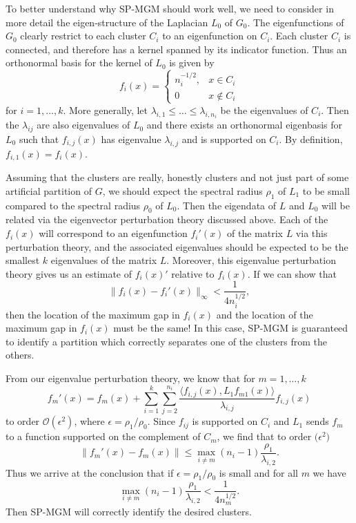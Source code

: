 \documentclass[10pt,journal,compsoc]{IEEEtran} %
\theoremstyle{definition}
\newcommand{\sheaf}[1]{\mathcal{#1}}
\begin{document}
To better understand why SP-MGM should work well, we need to consider
in more detail the eigen-structure of the Laplacian $L_0$ of
$G_0$.  The eigenfunctions of $G_0$ clearly restrict to each cluster
$C_i$ to an eigenfunction on $C_i$.  Each cluster $C_i$ is connected,
and therefore has a kernel spanned by its indicator function.  Thus an
orthonormal basis for the kernel of $L_0$ is given by
$$f_i(x) = \left\lbrace\begin{array}{cc}n_i^{-1/2}, & x\in C_i\\ 0 & x\notin C_i\end{array}\right.$$
for $i=1,\dots,k$.  More generally, let $\lambda_{i,1}\leq\dots\leq
\lambda_{i,n_i}$ be the eigenvalues of $C_i$.  Then the $\lambda_{ij}$
are also eigenvalues of $L_0$ and there exists an orthonormal
eigenbasis for $L_0$ such that $f_{i,j}(x)$ has eigenvalue
$\lambda_{i,j}$ and is supported on $C_i$.  By definition, $f_{i,1}(x)
= f_i(x)$.

Assuming that the clusters are really, honestly clusters and not just
part of some artificial partition of $G$, we should expect the
spectral radius $\rho_1$ of $L_1$ to be small compared
to the spectral radius $\rho_0$ of $L_0$.  Then the eigendata of $L$
and $L_0$ will be related via the eigenvector perturbation theory
discussed above.  Each of the $f_i(x)$ will correspond to an
eigenfunction $f_i'(x)$ of the matrix $L$ via this perturbation
theory, and the associated eigenvalues should be expected to be the
smallest $k$ eigenvalues of the matrix $L$.  Moreover, this eigenvalue
perturbation theory gives us an estimate of $f_i(x)'$ relative to
$f_i(x)$.  If we can show that
$$\|f_i(x)-f_i'(x)\|_\infty < \frac{1}{4n_i^{1/2}},$$
then the location of the maximum gap in $f_i(x)$ and the location of
the maximum gap in $f_i(x)$ must be the same!  In this case, SP-MGM is
guaranteed to identify a partition which correctly separates one of
the clusters from the others.

From our eigenvalue perturbation theory, we know that for
$m=1,\dots,k$
$$f_m'(x) = f_m(x) + \sum_{i=1}^k\sum_{j=2}^{n_i} \frac{\langle f_{i,j}(x),L_1 f_{m1}(x)\rangle}{\lambda_{i,j}}f_{i,j}(x)$$
to order $\sheaf O(\epsilon^2)$, where $\epsilon = \rho_1/\rho_0$.
Since $f_{ij}$ is supported on $C_i$ and $L_1$ sends $f_m$ to a
function supported on the complement of $C_m$, we find that to order
$\sheaf(\epsilon^2)$
$$\|f_m'(x) - f_m(x)\| \leq \max_{i\neq m}(n_i-1)\frac{\rho_1}{\lambda_{i,2}}.$$
Thus we arrive at the conclusion that if $\epsilon = \rho_1/\rho_0$ is
small and for all $m$ we have
$$\max_{i\neq m}(n_i-1)\frac{\rho_1}{\lambda_{i,2}} < \frac{1}{4n_m^{1/2}}.$$
Then SP-MGM will correctly identify the desired clusters.
\end{document}
